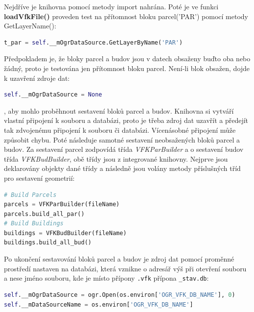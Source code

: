 Nejdříve je knihovna pomocí metody import nahrána. Poté je ve funkci
\textbf{loadVfkFile()} proveden test na přítomnost bloku parcel('PAR')
pomocí metody GetLayerName():
\begin{lstlisting}[language=Python, numbers=none]
t_par = self.__mOgrDataSource.GetLayerByName('PAR')
\end{lstlisting}
Předpokladem je, že bloky parcel a budov jsou v datech obsaženy buďto oba nebo žádný, proto je testována jen přítomnost bloku parcel. Není-li blok obsažen, dojde k uzavření zdroje dat:
\begin{lstlisting}[language=Python, numbers=none]
self.__mOgrDataSource = None
\end{lstlisting}
, aby mohlo proběhnout sestavení bloků parcel a budov. Knihovna si
vytváří vlastní připojení k  souboru a databázi, proto je
třeba zdroj dat uzavřít a předejít tak zdvojenému připojení k 
souboru či databázi. Vícenásobné připojení může způsobit chybu. Poté
následuje samotné sestavení neobsažených bloků parcel a budov. Za
sestavení parcel zodpovídá třída \textit{VFKParBuilder} a o sestavení
budov třída \textit{VFKBudBuilder}, obě třídy jsou z integrované
knihovny. Nejprve jsou deklarovány objekty dané třídy a následně jsou
volány metody příslušných tříd pro sestavení geometrií:

\begin{lstlisting}[language=Python, numbers=none]
# Build Parcels
parcels = VFKParBuilder(fileName)
parcels.build_all_par()
# Build Buildings
buildings = VFKBudBuilder(fileName)
buildings.build_all_bud()
\end{lstlisting}

Po ukončení sestavování bloků parcel a budov je zdroj dat pomocí
proměnné prostředí nastaven na databázi, která vznikne o adresář výš
při otevření  souboru a nese jméno  souboru, kde je
místo přípony \verb|.vfk| přípona \verb|_stav.db|: {\small
\begin{lstlisting}[language=Python, numbers=none]
self.__mOgrDataSource = ogr.Open(os.environ['OGR_VFK_DB_NAME'], 0)
self.__mDataSourceName = os.environ['OGR_VFK_DB_NAME']
\end{lstlisting}}

